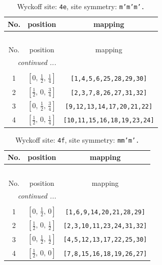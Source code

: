 \documentclass[fleqn,8pt]{jsarticle}
\begin{document}
\begin{longtable}{ccc}
\caption{Wyckoff site: {\tt 4e}, site symmetry: {\tt m'm'm'.}}
 \\
 \hline \hline
No. & position & mapping \\ \hline \endfirsthead

\multicolumn{2}{l}{\tablename\ \thetable{}} \\
 \hline \hline
No. & position & mapping \\ \hline \endhead

 \hline \hline
\multicolumn{2}{r}{\footnotesize\it continued ...} \\ \endfoot

 \hline \hline
\multicolumn{2}{r}{} \\ \endlastfoot

1 & $\left[ 0,\, \frac{1}{2},\, \frac{1}{4} \right]$ & {\tt [1,4,5,6,25,28,29,30]} \\ \hline
2 & $\left[ \frac{1}{2},\, 0,\, \frac{3}{4} \right]$ & {\tt [2,3,7,8,26,27,31,32]} \\ \hline
3 & $\left[ 0,\, \frac{1}{2},\, \frac{3}{4} \right]$ & {\tt [9,12,13,14,17,20,21,22]} \\ \hline
4 & $\left[ \frac{1}{2},\, 0,\, \frac{1}{4} \right]$ & {\tt [10,11,15,16,18,19,23,24]} \\
\end{longtable}
\renewcommand{\arraystretch}{1.2}
\begin{longtable}{ccc}
\caption{Wyckoff site: {\tt 4f}, site symmetry: {\tt mm'm'.}}
 \\
 \hline \hline
No. & position & mapping \\ \hline \endfirsthead

\multicolumn{2}{l}{\tablename\ \thetable{}} \\
 \hline \hline
No. & position & mapping \\ \hline \endhead

 \hline \hline
\multicolumn{2}{r}{\footnotesize\it continued ...} \\ \endfoot

 \hline \hline
\multicolumn{2}{r}{} \\ \endlastfoot

1 & $\left[ 0,\, \frac{1}{2},\, 0 \right]$ & {\tt [1,6,9,14,20,21,28,29]} \\ \hline
2 & $\left[ \frac{1}{2},\, 0,\, \frac{1}{2} \right]$ & {\tt [2,3,10,11,23,24,31,32]} \\ \hline
3 & $\left[ 0,\, \frac{1}{2},\, \frac{1}{2} \right]$ & {\tt [4,5,12,13,17,22,25,30]} \\ \hline
4 & $\left[ \frac{1}{2},\, 0,\, 0 \right]$ & {\tt [7,8,15,16,18,19,26,27]} \\
\end{longtable}
\end{document}
